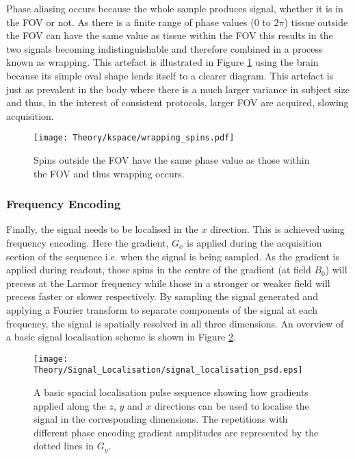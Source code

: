 Phase aliasing occurs because the whole sample produces signal, whether it is in the \ac{FOV} or not. As there is a finite range of phase values ($0$ to $2\pi$) tissue outside the \ac{FOV} can have the same value as tissue within the \ac{FOV} this results in the two signals becoming indistinguishable and therefore combined in a process known as wrapping. This artefact is illustrated in Figure \ref{fig:theory_wrapping_spins} using the brain because its simple oval shape lends itself to a clearer diagram. This artefact is just as prevalent in the body where there is a much larger variance in subject size and thus, in the interest of consistent protocols, larger \ac{FOV} are acquired, slowing acquisition.
\begin{figure}[H]
	\centering
	\texttt{[image: Theory/kspace/wrapping\_spins.pdf]}
	\caption{Spins outside the \ac{FOV} have the same phase value as those within the \ac{FOV} and thus wrapping occurs.}
	\label{fig:theory_wrapping_spins}	
\end{figure}

\subsubsection{Frequency Encoding}
Finally, the signal needs to be localised in the $x$ direction. This is achieved using frequency encoding. Here the gradient, $G_x$ is applied during the acquisition section of the sequence i.e. when the signal is being sampled. As the gradient is applied during readout, those spins in the centre of the gradient (at field $B_0$) will precess at the Larmor frequency while those in a stronger or weaker field will precess faster or slower respectively. By sampling the signal generated and applying a Fourier transform to separate components of the signal at each frequency, the signal is spatially resolved in all three dimensions. An overview of a basic signal localisation scheme is shown in Figure \ref{fig:theory_signal_loc}.
\begin{figure}[H]
	\centering
	\texttt{[image: Theory/Signal\_Localisation/signal\_localisation\_psd.eps]}
	\caption{A basic spacial localisation pulse sequence showing how gradients applied along the $z$, $y$ and $x$ directions can be used to localise the signal in the corresponding dimensions. The repetitions with different phase encoding gradient amplitudes are represented by the dotted lines in $G_y$.}
	\label{fig:theory_signal_loc}	
\end{figure}


